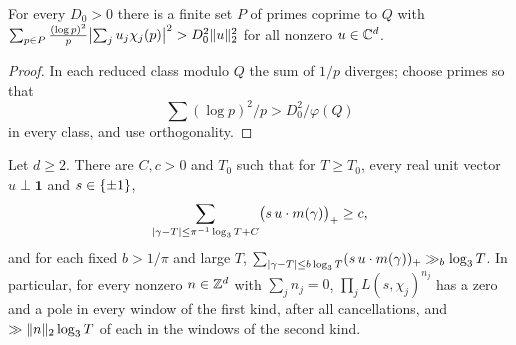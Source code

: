 \begin{lemma}\label{rec:lem:frame}
For every $D_0>0$ there is a finite set $P$ of primes coprime to $Q$ with
$\sum_{p\in P}\frac{(\log p)^2}p\bigl\lvert\sum_ju_j\chi_j(p)\bigr\rvert^2>D_0^2\lVert u\rVert_2^2$ for all nonzero $u\in\mathbb{C}^d$.
\end{lemma}

\begin{proof}
In each reduced class modulo $Q$ the sum of $1/p$ diverges; choose primes so that
\[
 \sum(\log p)^2/p>D_0^2/\varphi(Q)
\]
in every class, and use orthogonality.
\end{proof}

\begin{theorem}\label{rec:thm:bothsigns}
Let $d\ge2$. There are $C,c>0$ and $T_0$ such that for $T\ge T_0$, every real unit vector
$u\perp\mathbf 1$ and $s\in\{\pm1\}$,
\[
 \sum_{\lvert\gamma-T\rvert\le\pi^{-1}\log_3T+C}\bigl(s\,u\cdot m(\gamma)\bigr)_+\ge c,
\]
and for each fixed $b>1/\pi$ and large $T$,
$\sum_{\lvert\gamma-T\rvert\le b\log_3T}(s\,u\cdot m(\gamma))_+\gg_b\log_3T$. In particular, for every nonzero $n\in\mathbb{Z}^d$
with $\sum_jn_j=0$, $\prod_jL(s,\chi_j)^{n_j}$ has a zero and a pole in every window of the first
kind, after all cancellations, and $\gg\lVert n\rVert_2\log_3T$ of each in the windows of the second kind.
\end{theorem}

